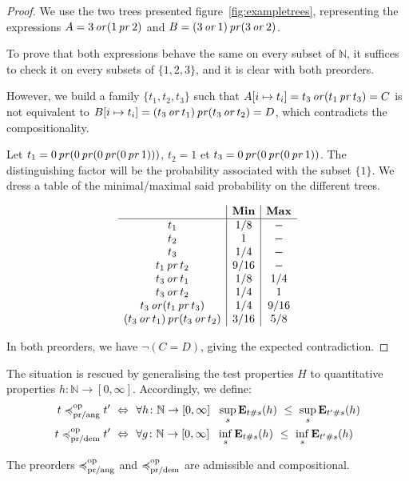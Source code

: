 \begin{proof}
    We use the two trees presented figure~\ref{fig:exampletrees},
    representing the expressions $A = 3 \operatorname{\mathit{or}} (1 \operatorname{\mathit{pr}} 2)$
    and $B = (3 \operatorname{\mathit{or}} 1) \operatorname{\mathit{pr}} (3 \operatorname{\mathit{or}} 2)$.

    To prove that both expressions behave the same on every subset of $\mathbb{N}$,
    it suffices to check it on every subsets of $\{ 1, 2, 3\}$, and it is clear
    with both preorders.

    However, we build a family $\{ t_1, t_2, t_3\}$ such that 
    $A[ i \mapsto t_i] = t_3 \operatorname{\mathit{or}} (t_1 \operatorname{\mathit{pr}} t_3) = C$ is not equivalent to 
    $B[ i\mapsto t_i] = (t_3 \operatorname{\mathit{or}} t_1) \operatorname{\mathit{pr}} (t_3 \operatorname{\mathit{or}} t_2) = D$,
    which contradicts the compositionality.

    Let $t_1 = 0 \operatorname{\mathit{pr}} (0 \operatorname{\mathit{pr}} (0 \operatorname{\mathit{pr}} (0 \operatorname{\mathit{pr}} 1)))$,
    $t_2 = 1$ et $t_3 = 0 \operatorname{\mathit{pr}} (0 \operatorname{\mathit{pr}} (0 \operatorname{\mathit{pr}} 1))$. The distinguishing 
    factor will be the probability associated with the subset $\{ 1 \}$.
    We dress a table of the minimal/maximal said probability on the different 
    trees.
    
    \begin{equation*}
        \begin{array}{c|c|c}
                & \textbf{Min} & \textbf{Max} \\ \hline
            t_1 & 1/8 & - \\
            t_2 & 1   & -   \\
            t_3 & 1/4 & - \\
            t_1 \operatorname{\mathit{pr}} t_2 & 9 / 16 & - \\
            t_3 \operatorname{\mathit{or}} t_1 & 1/8    & 1/4 \\
            t_3 \operatorname{\mathit{or}} t_2 & 1/4    & 1   \\
            t_3 \operatorname{\mathit{or}} (t_1 \operatorname{\mathit{pr}} t_3) & 1/4 & 9/16 \\
            (t_3 \operatorname{\mathit{or}} t_1) \operatorname{\mathit{pr}} (t_3 \operatorname{\mathit{or}} t_2) & 3 / 16 & 5/8 \\
        \end{array}
    \end{equation*}

    In both preorders, we have $\neg (C = D)$,
    giving the expected contradiction.
\end{proof}

The situation is rescued by generalising the test properties $H$ to 
quantitative properties $h \colon \mathbb{N} \to [0,\infty]$. 
Accordingly, we define:
\begin{align*}
t \preccurlyeq^{\text{op}}_{\text{pr/ang}} t' ~ \Leftrightarrow ~ ~& \forall h \colon \mathbb{N} \to [0,\infty]~~ \sup_s  \mathbf{E}_{t\#s} (h)~ \leq~ \sup_s \mathbf{E}_{t'\#s} (h)
\\
t \preccurlyeq^{\text{op}}_{\text{pr/dem}} t' ~ \Leftrightarrow ~ ~& \forall g \colon \mathbb{N} \to [0,\infty]~~ \inf_s  \mathbf{E}_{t\#s} (h)~ \leq~ \inf_s \mathbf{E}_{t'\#s} (h)
\end{align*}
\begin{proposition}
The preorders $\preccurlyeq^{\text{op}}_{\text{pr/ang}}$ and $\preccurlyeq^{\text{op}}_{\text{pr/dem}}$ are admissible and compositional.
\end{proposition}


